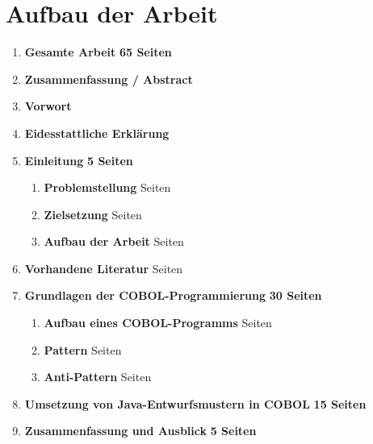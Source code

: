 \section{Aufbau der Arbeit}

\begin{framed}
\begin{enumerate}[label=\arabic*.]
	\item[] \LARGE{\textbf{Gesamte Arbeit} \dotfill \textbf{65 Seiten}}
	\item[] \textbf{Zusammenfassung / Abstract}
    \item[] \textbf{Vorwort}
    \item[] \textbf{Eidesstattliche Erklärung}
	\item 
    	\textbf{Einleitung} \dotfill \textbf{5 Seiten}
    	\begin{enumerate}[label=\arabic*.]
    		\item \textbf{Problemstellung}  Seiten
        	\item \textbf{Zielsetzung}  Seiten
            \item \textbf{Aufbau der Arbeit}  Seiten
    	\end{enumerate}
    \item \textbf{Vorhandene Literatur}  Seiten
    \item \textbf{Grundlagen der COBOL-Programmierung} \dotfill \textbf{30 Seiten}
    	\begin{enumerate}[label=\arabic*.]
    	\item \textbf{Aufbau eines COBOL-Programms}  Seiten
        \item \textbf{Pattern}  Seiten
        \item \textbf{Anti-Pattern}  Seiten
    	\end{enumerate}
    \item \textbf{Umsetzung von Java-Entwurfsmustern in COBOL} \dotfill \textbf{15 Seiten}
    \item \textbf{Zusammenfassung und Ausblick} \dotfill \textbf{5 Seiten}
\end{enumerate}
\end{framed}